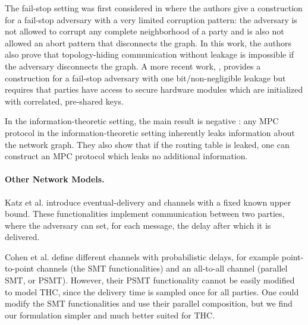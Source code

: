 The fail-stop setting was first considered in \cite{TCC:MorOrlRic15} where the authors give a construction for a fail-stop adversary with a very limited corruption pattern: the adversary is not allowed to corrupt any complete neighborhood of a party and is also not allowed an abort pattern that disconnects the graph. In this work, the authors also prove that topology-hiding communication without leakage is impossible if the adversary disconnects the graph. A more recent work, \cite{BBMM18}, provides a construction for a fail-stop adversary with one bit/non-negligible leakage but requires that parties have access to secure hardware modules which are initialized with correlated, pre-shared keys.

In the information-theoretic setting, the main result is negative \cite{HJ07}: any MPC protocol in the information-theoretic setting inherently leaks information about the network graph. They also show that if the routing table is leaked, one can construct an MPC protocol which leaks no additional information.

\paragraph{Other Network Models.}
Katz et al. \cite{KMTZ13} introduce eventual-delivery and channels with a fixed known upper bound. These functionalities implement communication between two parties, where the adversary can set, for each message, the delay after which it is delivered. %

Cohen et al. \cite{CCGZ16} define different channels with probabilistic 
delays, for example point-to-point channels (the SMT functionalities) and an 
all-to-all channel (parallel SMT, or PSMT).
However, their PSMT functionality cannot be easily modified to model THC, since 
the delivery time is sampled once for all parties.
One could modify the SMT functionalities and use their parallel composition, 
but we find our formulation simpler and much better suited for THC.

